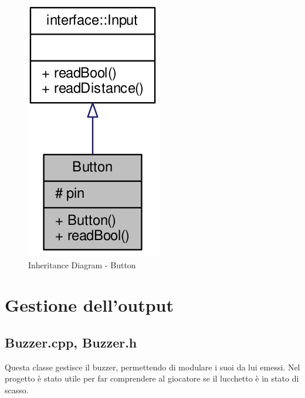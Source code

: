 \begin{figure}[!ht]
	\centering
	\includegraphics[scale=.35]{img/UML/InheritanceDiagram/Button.png}
	\caption{Inheritance Diagram - Button}
\end{figure}

\newpage
\section{Gestione dell'output}
\subsection{Buzzer.cpp, Buzzer.h}
Questa classe gestisce il buzzer, permettendo di modulare i suoi da lui emessi. Nel progetto è stato utile per far comprendere al giocatore se il lucchetto è in stato di scasso.
